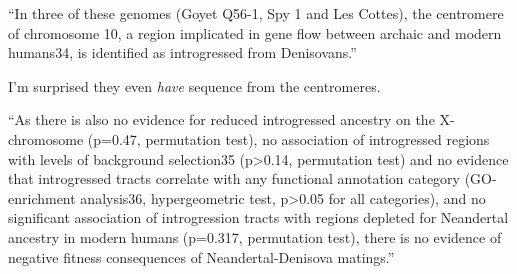 \documentclass{article}
\begin{document}
``In three of these genomes (Goyet Q56-1, Spy 1 and Les Cottes), the
centromere of chromosome 10, a region implicated in gene flow between
archaic and modern humans34, is identified as introgressed from
Denisovans.''

I'm surprised they even \emph{have} sequence from the centromeres.

``As there is also no evidence for reduced introgressed ancestry on
the X-chromosome (p=0.47, permutation test), no association of
introgressed regions with levels of background selection35 (p>0.14,
permutation test) and no evidence that introgressed tracts correlate
with any functional annotation category (GO-enrichment analysis36,
hypergeometric test, p>0.05 for all categories), and no significant
association of introgression tracts with regions depleted for
Neandertal ancestry in modern humans (p=0.317, permutation test),
there is no evidence of negative fitness consequences of
Neandertal-Denisova matings.''
\end{document}
